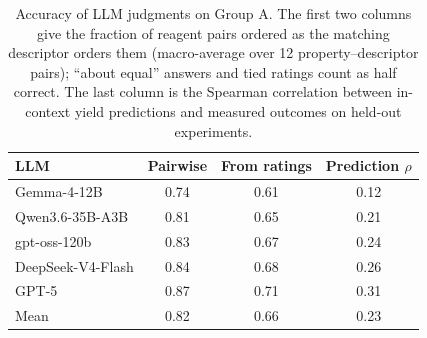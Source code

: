 \begin{table}[t]
\centering
\small
\setlength{\tabcolsep}{3.6pt}
\begin{tabular}{@{}l ccc@{}}
\toprule
LLM & Pairwise & From ratings & Prediction $\rho$ \\
\midrule
Gemma-4-12B & 0.74 & 0.61 & 0.12 \\
Qwen3.6-35B-A3B & 0.81 & 0.65 & 0.21 \\
gpt-oss-120b & 0.83 & 0.67 & 0.24 \\
DeepSeek-V4-Flash & 0.84 & 0.68 & 0.26 \\
GPT-5 & 0.87 & 0.71 & 0.31 \\
\midrule
Mean & 0.82 & 0.66 & 0.23 \\
\bottomrule
\end{tabular}
\caption{Accuracy of LLM judgments on Group A. The first two columns give the fraction of reagent pairs ordered as the matching descriptor orders them (macro-average over 12 property--descriptor pairs); ``about equal'' answers and tied ratings count as half correct. The last column is the Spearman correlation between in-context yield predictions and measured outcomes on held-out experiments.}
\label{tab:rq0}
\end{table}
